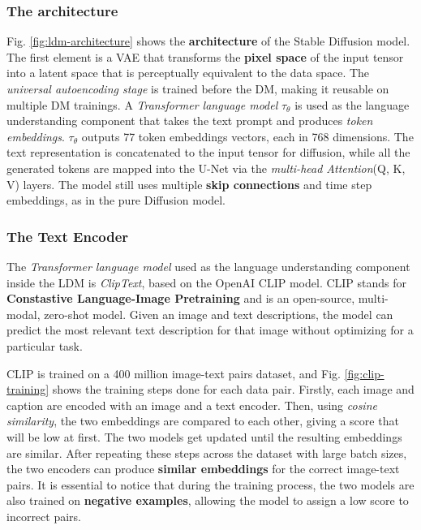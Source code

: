 \documentclass[preprint]{elsarticle}
\begin{document}
\subsubsection{The architecture}\label{sec:ldm-architecture} 

Fig. \ref{fig:ldm-architecture} shows the \textbf{architecture} of the Stable Diffusion model.
The first element is a VAE that transforms the \textbf{pixel space} of the input tensor into a latent space that is 
perceptually equivalent to the data space. The \emph{universal autoencoding stage} is trained before the DM, 
making it reusable on multiple DM trainings. A \emph{Transformer language model} $\tau_\theta$ is used as the language understanding component 
that takes the text prompt and produces \emph{token embeddings}. $\tau_\theta$ outputs 77 token embeddings vectors, each in 768 dimensions. 
The text representation is concatenated to the input tensor for diffusion, while all the generated tokens are mapped into the 
U-Net via the \emph{multi-head Attention}(Q, K, V) layers. The model still uses multiple \textbf{skip connections} and time step embeddings,
as in the pure Diffusion model.

\subsubsection{The Text Encoder}
The \emph{Transformer language model} used as the language understanding component inside the LDM is \emph{ClipText}, based on the OpenAI CLIP model.
CLIP stands for \textbf{Constastive Language-Image Pretraining} and is an open-source, multi-modal, zero-shot model. 
Given an image and text descriptions, the model can predict the most relevant text description for that image without 
optimizing for a particular task.


CLIP is trained on a 400 million image-text pairs dataset, and Fig. \ref{fig:clip-training} shows the training steps done for each 
data pair.
Firstly, each image and caption are encoded with an image and a text encoder. Then, using \emph{cosine similarity}, 
the two embeddings are compared to each other, giving a score that will be low at first. 
The two models get updated until the resulting embeddings are similar. 
After repeating these steps across the dataset with large batch sizes, the two encoders can produce \textbf{similar embeddings} 
for the correct image-text pairs. It is essential to notice that during the training process, 
the two models are also trained on \textbf{negative examples}, allowing the model to assign a low score to incorrect pairs.
\end{document}
